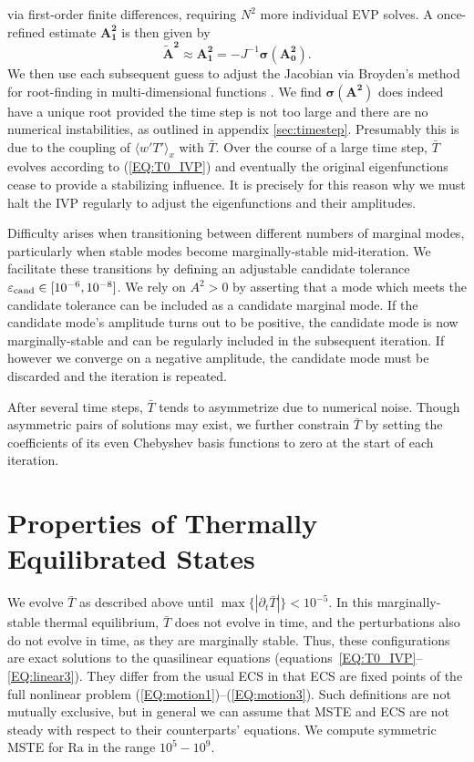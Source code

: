 \documentclass[reprint,amsmath,amssymb,aps]{revtex4-1}
\newcommand\Ra{\mathrm{Ra}}
\renewcommand{\vec}[1]{\boldsymbol{#1}}
\newcommand{\eq}[1]{(\ref{#1})}
\newcommand{\eqss}[2]{(\ref{#1})--(\ref{#2})}
\begin{document}
via first-order finite differences, requiring $N^2$ more individual EVP solves.
A once-refined estimate $\vec{A^2_1}$ is then given by
\begin{equation}
    \vec{\tilde{A}^2} \approx \vec{A^2_1} = -J^{-1} \vec{\sigma}(\vec{A^2_0}).
\end{equation}
We then use each subsequent guess to adjust the Jacobian via Broyden's method for root-finding in multi-dimensional functions \cite{Broyden}.
We find $\vec{\sigma}(\vec{A^2})$ does indeed have a unique root provided the time step is not too large and there are no numerical instabilities, as outlined in appendix \ref{sec:timestep}.
Presumably this is due to the coupling of $\langle w'T' \rangle_x$ with $\bar{T}$.
Over the course of a large time step, $\bar{T}$ evolves according to \eq{EQ:T0_IVP} and eventually the original eigenfunctions cease to provide a stabilizing influence.
It is precisely for this reason why we must halt the IVP regularly to adjust the eigenfunctions and their amplitudes.

Difficulty arises when transitioning between different numbers of marginal modes, particularly when stable modes become marginally-stable mid-iteration.
We facilitate these transitions by defining an adjustable candidate tolerance $\varepsilon_{\rm{cand}} \in [10^{-6}, 10^{-8}]$.
We rely on $A^2 > 0$ by asserting that a mode which meets the candidate tolerance can be included as a candidate marginal mode.
If the candidate mode's amplitude turns out to be positive, the candidate mode is now marginally-stable and can be regularly included in the subsequent iteration.
If however we converge on a negative amplitude, the candidate mode must be discarded and the iteration is repeated. 

After several time steps, $\bar{T}$ tends to asymmetrize due to numerical noise. 
Though asymmetric pairs of solutions may exist, we further constrain $\bar{T}$ by setting the coefficients of its even Chebyshev basis functions to zero at the start of each iteration.

\section{Properties of Thermally Equilibrated States}\label{sec:properties}
We evolve $\bar{T}$ as described above until $\max\{|\partial_{t}\bar{T}|\} < 10^{-5}$.
In this marginally-stable thermal equilibrium, $\bar{T}$ does not evolve in time, and the perturbations also do not evolve in time, as they are marginally stable.
Thus, these configurations are exact solutions to the quasilinear equations (equations~\ref{EQ:T0_IVP}--\ref{EQ:linear3}).
They differ from the usual ECS in that ECS are fixed points of the full nonlinear problem \eqss{EQ:motion1}{EQ:motion3}. 
Such definitions are not mutually exclusive, but in general we can assume that MSTE and ECS are not steady with respect to their counterparts' equations.
We compute symmetric MSTE for $\Ra$ in the range $10^5 - 10^9$.
\end{document}

